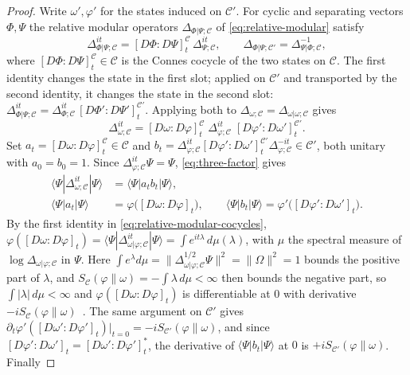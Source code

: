 \documentclass[a4paper,11pt]{article}
\theoremstyle{definition}
\newcommand{\nn}{\nonumber}
\begin{document}
\begin{proof}
Write $\omega',\varphi'$ for the states induced on $\mathcal C'$. For cyclic and separating vectors $\Phi,\Psi$ the relative modular operators $\Delta_{\Phi|\Psi;\mathcal C}$ of \eqref{eq:relative-modular} satisfy~\cite{Araki1976,Araki1977}
\begin{equation}
 \Delta_{\Phi|\Psi;\mathcal C}^{it}=[D\Phi:D\Psi]^{\mathcal C}_t\,\Delta_{\Psi;\mathcal C}^{it},
 \qquad
 \Delta_{\Phi|\Psi;\mathcal C'}=\Delta_{\Psi|\Phi;\mathcal C}^{-1},
 \label{eq:relative-modular-cocycles}
\end{equation}
where $[D\Phi:D\Psi]^{\mathcal C}_t\in\mathcal C$ is the Connes cocycle of the two states on $\mathcal C$. The first identity changes the state in the first slot; applied on $\mathcal C'$ and transported by the second identity, it changes the state in the second slot: $\Delta_{\Phi|\Psi;\mathcal C}^{it}=\Delta_{\Phi;\mathcal C}^{it}\,[D\Phi':D\Psi']^{\mathcal C'}_t$. Applying both to $\Delta_{\omega;\mathcal C}=\Delta_{\omega|\omega;\mathcal C}$ gives
\begin{equation}
 \Delta_{\omega;\mathcal C}^{it}=[D\omega:D\varphi]^{\mathcal C}_t\;\Delta_{\varphi;\mathcal C}^{it}\;[D\varphi':D\omega']^{\mathcal C'}_t .
 \label{eq:three-factor}
\end{equation}
Set $a_t=[D\omega:D\varphi]^{\mathcal C}_t\in\mathcal C$ and $b_t=\Delta_{\varphi;\mathcal C}^{it}[D\varphi':D\omega']^{\mathcal C'}_t\Delta_{\varphi;\mathcal C}^{-it}\in\mathcal C'$, both unitary with $a_0=b_0=1$. Since $\Delta_{\varphi;\mathcal C}^{it}\Psi=\Psi$, \eqref{eq:three-factor} gives
\begin{align}
 \langle\Psi|\Delta_{\omega;\mathcal C}^{it}|\Psi\rangle&=\langle\Psi|a_tb_t|\Psi\rangle,\nn\\
 \langle\Psi|a_t|\Psi\rangle&=\varphi\bigl([D\omega:D\varphi]_t\bigr),
 \qquad
 \langle\Psi|b_t|\Psi\rangle=\varphi'\bigl([D\varphi':D\omega']_t\bigr).
\end{align}
By the first identity in \eqref{eq:relative-modular-cocycles}, $\varphi([D\omega:D\varphi]_t)=\langle\Psi|\Delta_{\omega|\varphi;\mathcal C}^{it}|\Psi\rangle=\int e^{it\lambda}\,d\mu(\lambda)$, with $\mu$ the spectral measure of $\log\Delta_{\omega|\varphi;\mathcal C}$ in $\Psi$. Here $\int e^{\lambda}d\mu=\|\Delta_{\omega|\varphi;\mathcal C}^{1/2}\Psi\|^2=\|\Omega\|^2=1$ bounds the positive part of $\lambda$, and $S_{\mathcal C}(\varphi\|\omega)=-\int\lambda\,d\mu<\infty$ then bounds the negative part, so $\int|\lambda|\,d\mu<\infty$ and $\varphi([D\omega:D\varphi]_t)$ is differentiable at $0$ with derivative $-iS_{\mathcal C}(\varphi\|\omega)$~\cite{OhyaPetz1993}. The same argument on $\mathcal C'$ gives $\partial_t\varphi'([D\omega':D\varphi']_t)|_{t=0}=-iS_{\mathcal C'}(\varphi\|\omega)$, and since $[D\varphi':D\omega']_t=[D\omega':D\varphi']_t^*$, the derivative of $\langle\Psi|b_t|\Psi\rangle$ at $0$ is $+iS_{\mathcal C'}(\varphi\|\omega)$. Finally

\end{proof}
\end{document}

